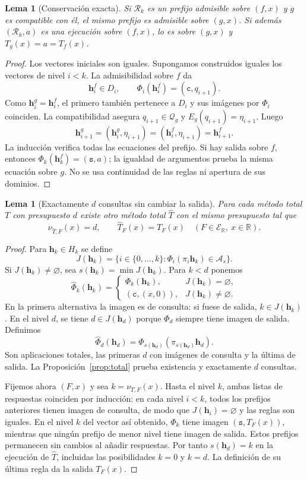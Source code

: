 \documentclass[11pt,a4paper]{article}
\numberwithin{equation}{section}
\newtheorem{lemma}[theorem]{Lema}
\theoremstyle{definition}
\theoremstyle{remark}
\newcommand{\R}{\mathbb R}
\newcommand{\ER}{\mathcal E_{\R}}
\newcommand{\QQ}{\mathcal Q}
\newcommand{\Rec}{\mathcal R}
\newcommand{\hc}{\mathbf h}
\newcommand{\ct}{\mathtt c}
\newcommand{\st}{\mathtt s}
\begin{document}
\begin{lemma}[Conservación exacta]\label{lem:preserve}
Si $\Rec_k$ es un prefijo admisible sobre $(f,x)$ y $g$ es compatible con él, el mismo prefijo es admisible sobre $(g,x)$. Si además $(\Rec_k,a)$ es una ejecución sobre $(f,x)$, lo es sobre $(g,x)$ y $T_g(x)=a=T_f(x)$.
\end{lemma}
\begin{proof}
Los vectores iniciales son iguales. Supongamos construidos iguales los vectores de nivel $i<k$. La admisibilidad sobre $f$ da
\[
\hc_i^f\in D_i,\qquad \Phi_i(\hc_i^f)=(\ct,q_{i+1}).
\]
Como $\hc_i^g=\hc_i^f$, el primero también pertenece a $D_i$ y sus imágenes por $\Phi_i$ coinciden. La compatibilidad asegura $q_{i+1}\in\QQ_g$ y $E_g(q_{i+1})=\eta_{i+1}$. Luego
\[
\hc_{i+1}^g=(\hc_i^g,\eta_{i+1})=(\hc_i^f,\eta_{i+1})=\hc_{i+1}^f.
\]
La inducción verifica todas las ecuaciones del prefijo. Si hay salida sobre $f$, entonces $\Phi_k(\hc_k^f)=(\st,a)$; la igualdad de argumentos prueba la misma ecuación sobre $g$. No se usa continuidad de las reglas ni apertura de sus dominios.
\end{proof}

\begin{lemma}[Exactamente $d$ consultas sin cambiar la salida]\label{lem:padding}
Para cada método total $T$ con presupuesto $d$ existe otro método total $\widehat T$ con el mismo presupuesto tal que
\[
\nu_{\widehat T,F}(x)=d,\qquad \widehat T_F(x)=T_F(x)
\quad(F\in\ER,\ x\in\R).
\]
\end{lemma}
\begin{proof}
Para $\hc_k\in H_k$ se define
\[
J(\hc_k)=\{i\in\{0,\ldots,k\}:\Phi_i(\pi_i\hc_k)\in\mathcal A_s\}.
\]
Si $J(\hc_k)\ne\varnothing$, sea $s(\hc_k)=\min J(\hc_k)$. Para $k<d$ ponemos
\[
\widehat\Phi_k(\hc_k)=
\begin{cases}
\Phi_k(\hc_k),&J(\hc_k)=\varnothing,\\
(\ct,(x,0)),&J(\hc_k)\ne\varnothing.
\end{cases}
\]
En la primera alternativa la imagen es de consulta: si fuese de salida, $k\in J(\hc_k)$. En el nivel $d$, se tiene $d\in J(\hc_d)$ porque $\Phi_d$ siempre tiene imagen de salida. Definimos
\[
\widehat\Phi_d(\hc_d)=\Phi_{s(\hc_d)}(\pi_{s(\hc_d)}\hc_d).
\]
Son aplicaciones totales, las primeras $d$ con imágenes de consulta y la última de salida. La Proposición~\ref{prop:total} prueba existencia y exactamente $d$ consultas.

Fijemos ahora $(F,x)$ y sea $k=\nu_{T,F}(x)$. Hasta el nivel $k$, ambas listas de respuestas coinciden por inducción: en cada nivel $i<k$, todos los prefijos anteriores tienen imagen de consulta, de modo que $J(\hc_i)=\varnothing$ y las reglas son iguales. En el nivel $k$ del vector así obtenido, $\Phi_k$ tiene imagen $(\st,T_F(x))$, mientras que ningún prefijo de menor nivel tiene imagen de salida. Estos prefijos permanecen sin cambios al añadir respuestas. Por tanto $s(\hc_d)=k$ en la ejecución de $\widehat T$, incluidas las posibilidades $k=0$ y $k=d$. La definición de su última regla da la salida $T_F(x)$.
\end{proof}
\end{document}
